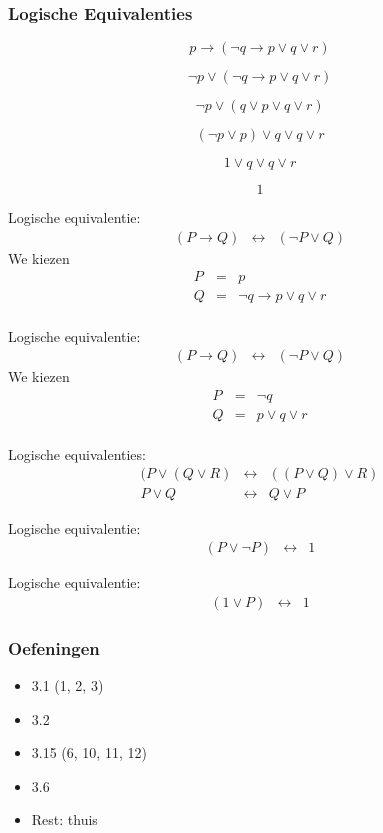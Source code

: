 \documentclass[dutch]{../khlslides}
\newcommand{\OR}{\vee}
\newcommand{\IMPLIES}{\rightarrow}
\newcommand{\IFF}{\leftrightarrow}
\newcommand{\NOT}{\neg}
\begin{document}
\begin{frame}
  \frametitle{Logische Equivalenties}
  \Large
  \begin{overprint}
    \[
      p \IMPLIES (\NOT q \IMPLIES p \OR q \OR r)
    \]

    \[
      \NOT p \OR (\NOT q \IMPLIES p \OR q \OR r)
    \]

    \[
      \NOT p \OR (q \OR p \OR q \OR r)
    \]

    \[
      (\NOT p \OR p) \OR q \OR q \OR r
    \]

    \[
      1 \OR q \OR q \OR r
    \]

    \[
      1
    \]
  \end{overprint}
  \vskip2cm
  \begin{overprint}
    Logische equivalentie:
    \[
      \begin{array}{rcl}
        (P \IMPLIES Q) & \IFF & (\NOT P \OR Q)
      \end{array}
    \]
    We kiezen
    \[
      \begin{array}{rcl}
        P & = & p \\
        Q & = & \NOT q \IMPLIES p \OR q \OR r \\
      \end{array}
    \]

    Logische equivalentie:
    \[
      \begin{array}{rcl}
        (P \IMPLIES Q) & \IFF & (\NOT P \OR Q)
      \end{array}
    \]
    We kiezen
    \[
      \begin{array}{rcl}
        P & = & \NOT q \\
        Q & = & p \OR q \OR r \\
      \end{array}
    \]

    Logische equivalenties:
    \[
      \begin{array}{rcl}
        (P \OR (Q \OR R) & \IFF & ((P \OR Q) \OR R) \\
        P \OR Q & \IFF & Q \OR P
      \end{array}
    \]

    Logische equivalentie:
    \[
      \begin{array}{rcl}
        (P \OR \NOT P) & \IFF & 1
      \end{array}
    \]

    Logische equivalentie:
    \[
      \begin{array}{rcl}
        (1 \OR P) & \IFF & 1
      \end{array}
    \]
  \end{overprint}
\end{frame}

\begin{frame}
  \frametitle{Oefeningen}
  \begin{itemize}
    \item 3.1 (1, 2, 3)
    \item 3.2
    \item 3.15 (6, 10, 11, 12)
    \item 3.6
    \item Rest: thuis
  \end{itemize}
\end{frame}
\end{document}
